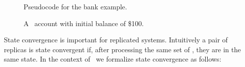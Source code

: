 \begin{figure}[t]
\centering
\begin{minipage}{0.5\columnwidth}
\end{minipage}
\caption{Pseudocode for the bank example.}
\label{fig:bankPseudo}
\end{figure}

\begin{figure}[t]
\centering
\begin{minipage}[t]{0.6\columnwidth}
\centering
{}
\end{minipage}
\par\bigskip
\begin{minipage}[t]{0.6\columnwidth}
\centering
{}
\end{minipage}
\caption{A \RBct\ account with initial balance of \$100.}
\label{fig:bankexample}
\end{figure}

State convergence is important for replicated systems. Intuitively a
pair of replicas is state convergent if, after processing the same
set of \operations, they are in the same state.  In the context of
\RBc\ we formalize state convergence as follows:

